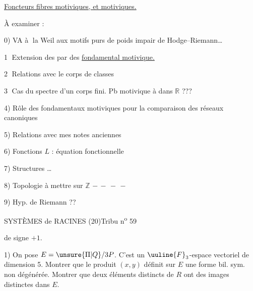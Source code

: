 
\uline{Foncteurs fibres motiviques, et   motiviques.}

À examiner :

0) VA \textcircled{à la Weil}  aux motifs purs de poids impair 
 de Hodge--Riemann\ldots

\textcircled{1} Extension des   par des 
\uline{ fondamental motivique.}

\textcircled{2} Relations avec le corps de classes

\textcircled{3} Cas du spectre d'un corps fini. Pb motivique
 à  dans $\mathbb{R}$ ???

\margin{*}
4) Rôle des  fondamentaux motiviques pour la comparaison des réseaux canoniques

5) Relations  avec mes notes anciennes

6) Fonctions $L$ : équation fonctionnelle

7) Structures \ldots

8) Topologie à mettre sur $\mathbb{Z}$ $-\, -\, -\, -$

9) Hyp. de Riemann ??




SYSTÈMES de RACINES (20)\hfill Tribu n\textsuperscript{o} 59

de signe $+1$.

1) On pose $E=\unsure{\Pi|Q}/3P$. C'est un $\uuline{F}_3$-espace vectoriel de dimension 5. Montrer que le produit $(x,y)$ définit sur $E$ une forme bil. sym. non dégénérée. Montrer que deux éléments distincts de $R$ ont des images distinctes dans $E$.

